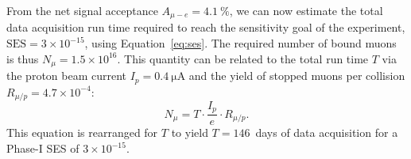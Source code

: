 From the net signal acceptance $A_{\mu-e} = \SI{4.1}{\percent}$, we can now
estimate the total data acquisition run time required to reach the sensitivity
goal of the experiment, $\mathrm{SES} = 3\times 10^{-15}$, using
Equation~\ref{eq:ses}. The required number of bound muons is thus $N_\mu = 1.5
\times 10^{16}$. This quantity can be related to the total run time $T$ via the
proton beam current $I_p = \SI{0.4}{\micro\ampere}$ and the yield of stopped
muons per collision $R_{\mu / p} = 4.7\times 10^{-4}$:
$$
N_\mu = T \cdot \frac{I_p}{e} \cdot R_{\mu / p}.
$$
This equation is rearranged for $T$ to yield $T = 146$~days of data acquisition
for a Phase-I SES of $3 \times 10^{-15}$.
